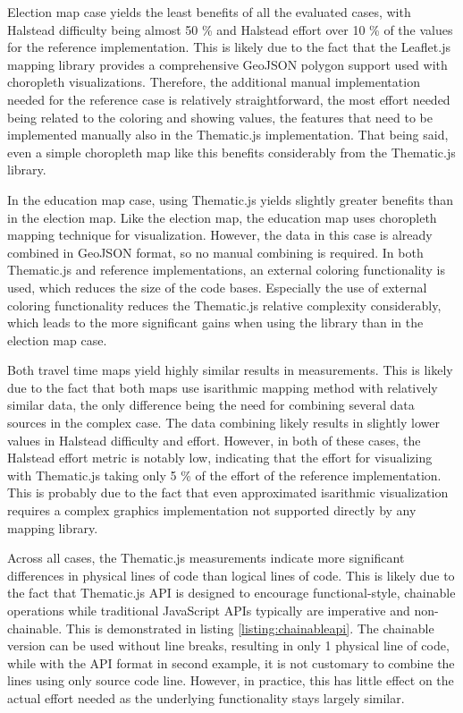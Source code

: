 
Election map case yields the least benefits of all the evaluated cases, with Halstead difficulty being almost 50 \% and Halstead effort over 10 \% of the values for the reference implementation. This is likely due to the fact that the Leaflet.js mapping library provides a comprehensive GeoJSON polygon support used with choropleth visualizations. Therefore, the additional manual implementation needed for the reference case is relatively straightforward, the most effort needed being related to the coloring and showing values, the features that need to be implemented manually also in the Thematic.js implementation. That being said, even a simple choropleth map like this benefits considerably from the Thematic.js library.

In the education map case, using Thematic.js yields slightly greater benefits than in the election map. Like the election map, the education map uses choropleth mapping technique for visualization. However, the data in this case is already combined in GeoJSON format, so no manual combining is required. In both Thematic.js and reference implementations, an external coloring functionality is used, which reduces the size of the code bases. Especially the use of external coloring functionality reduces the Thematic.js relative complexity considerably, which leads to the more significant gains when using the library than in the election map case.

Both travel time maps yield highly similar results in measurements. This is likely due to the fact that both maps use isarithmic mapping method with relatively similar data, the only difference being the need for combining several data sources in the complex case. The data combining likely results in slightly lower values in Halstead difficulty and effort. However, in both of these cases, the Halstead effort metric is notably low, indicating that the effort for visualizing with Thematic.js taking only 5 \% of the effort of the reference implementation. This is probably due to the fact that even approximated isarithmic visualization requires a complex graphics implementation not supported directly by any mapping library.

Across all cases, the Thematic.js measurements indicate more significant differences in physical lines of code than logical lines of code. This is likely due to the fact that Thematic.js API is designed to encourage functional-style, chainable operations while traditional JavaScript APIs typically are imperative and non-chainable. This is demonstrated in listing \ref{listing:chainableapi}. The chainable version can be used without line breaks, resulting in only 1 physical line of code, while with the API format in second example, it is not customary to combine the lines using only source code line. However, in practice, this has little effect on the actual effort needed as the underlying functionality stays largely similar.


